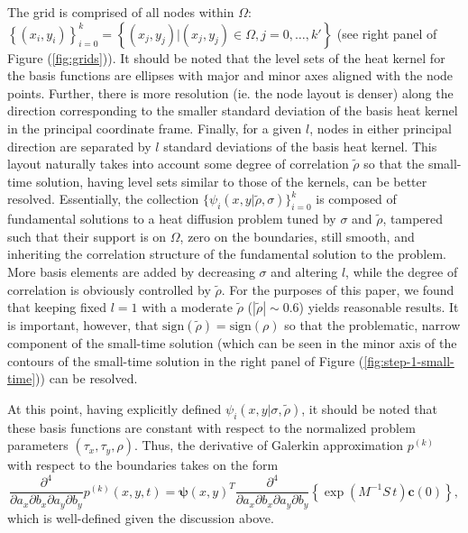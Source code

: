 \documentclass[10pt]{article}
\begin{document}
The grid is comprised of all nodes within $\Omega$:
$\left\{(x_i, y_i)\right\}_{i=0}^k = \left\{ (x_j, y_j) | (x_j, y_j)
  \in \Omega, j = 0, \ldots, k' \right\}$ (see right panel of Figure
(\ref{fig:grids})). It should be noted that the level sets of the heat
kernel for the basis functions are ellipses with major and minor axes
aligned with the node points. Further, there is more resolution
(ie. the node layout is denser) along the direction corresponding to
the smaller standard deviation of the basis heat kernel in the
principal coordinate frame. Finally, for a given $l$, nodes in either
principal direction are separated by $l$ standard deviations of the
basis heat kernel. This layout naturally takes into account some
degree of correlation $\tilde{\rho}$ so that the small-time solution,
having level sets similar to those of the kernels, can be better
resolved. Essentially, the collection
$\{ \psi_i(x,y| \tilde{\rho}, \sigma) \}_{i=0}^k$ is composed of
fundamental solutions to a heat diffusion problem tuned by $\sigma$
and $\tilde{\rho}$, tampered such that their support is on $\Omega$,
zero on the boundaries, still smooth, and inheriting the correlation
structure of the fundamental solution to the problem. More basis
elements are added by decreasing $\sigma$ and altering $l$, while the
degree of correlation is obviously controlled by $\tilde{\rho}$. For
the purposes of this paper, we found that keeping fixed $l=1$ with a
moderate $\tilde{\rho}$ ($|\tilde{\rho}| \sim 0.6$) yields reasonable
results. It is important, however, that
$\mbox{sign}(\tilde{\rho}) = \mbox{sign}(\rho)$ so that the
problematic, narrow component of the small-time solution (which can be
seen in the minor axis of the contours of the small-time solution in
the right panel of Figure (\ref{fig:step-1-small-time})) can be
resolved.

%

At this point, having explicitly defined
$\psi_i(x,y|\sigma,\tilde{\rho})$, it should be noted that these basis
functions are constant with respect to the normalized problem
parameters $(\tau_x, \tau_y, \rho)$. Thus, the derivative of Galerkin
approximation $p^{(k)}$ with respect to the boundaries takes on the
form
\[
  \frac{\partial^4}{\partial a_x \partial b_x \partial a_y \partial
    b_y} p^{(k)}(x,y,t) = \boldsymbol{\psi}(x,y)^T
  \frac{\partial^4}{\partial a_x \partial b_x \partial a_y \partial
    b_y} \left\{ \exp\left( M^{-1}S\, t \right) \mathbf{c}(0) \right\},
\]
which is well-defined given the discussion above.
\end{document}
